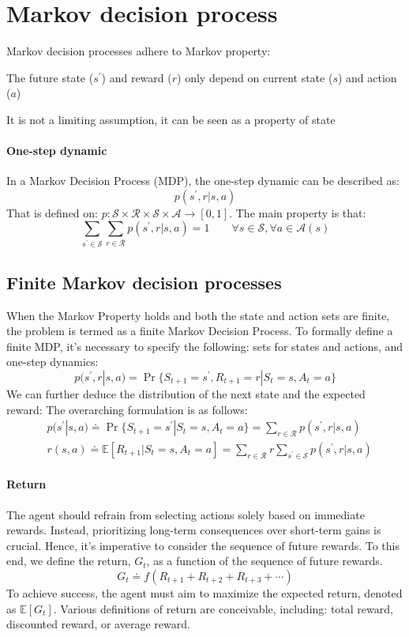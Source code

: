 \section{Markov decision process}

Markov decision processes adhere to Markov property: 
\begin{property}
    The future state ($s^\prime$) and reward ($r$) only depend on current state ($s$) and action ($a$)
\end{property}
It is not a limiting assumption, it can be seen as a
property of state 

\paragraph*{One-step dynamic}
In a Markov Decision Process (MDP), the one-step dynamic can be described as:
\[p(s^\prime,r|s,a)\]
That is defined on: $p:\mathcal{S}\times\mathcal{R}\times\mathcal{S}\times\mathcal{A}\rightarrow\left[0,1\right]$. 
The main property is that: 
\[\sum_{s^\prime\in\mathcal{S}}\sum_{r\in\mathcal{R}}p(s^\prime,r|s,a)=1\qquad \forall s \in \mathcal{S},\forall a\in\mathcal{A}(s)\]

\subsection{Finite Markov decision processes}
When the Markov Property holds and both the state and action sets are finite, the problem is termed as a finite Markov Decision Process. 
To formally define a finite MDP, it's necessary to specify the following: sets for states and actions, and one-step dynamics:
\[p(s^\prime, r | s, a) = \Pr\{S_{t+1}=s^\prime, R_{t+1}=r | S_t=s, A_t=a\}\]
We can further deduce the distribution of the next state and the expected reward: 
The overarching formulation is as follows:
\begin{align*}
    &p(s^\prime | s, a) \doteq \Pr\{S_{t+1} = s^\prime | S_t = s, A_t = a\} = \sum_{r \in \mathcal{R}} p(s^\prime, r | s, a) \\
    &r(s, a) \doteq \mathbb{E}\left[R_{t+1} | S_t = s, A_t = a\right] = \sum_{r \in \mathcal{R}} r \sum_{s^\prime \in \mathcal{S}} p(s^\prime, r | s, a) 
\end{align*}

\paragraph*{Return}
The agent should refrain from selecting actions solely based on immediate rewards. 
Instead, prioritizing long-term consequences over short-term gains is crucial. 
Hence, it's imperative to consider the sequence of future rewards. 
To this end, we define the return, $G_t$, as a function of the sequence of future rewards.
\[G_t \doteq f\left(R_{t+1}+R_{t+2}+R_{t+3}+\cdots\right)\]
To achieve success, the agent must aim to maximize the expected return, denoted as $\mathbb{E}\left[G_t\right]$. 
Various definitions of return are conceivable, including: total reward, discounted reward, or average reward. 

